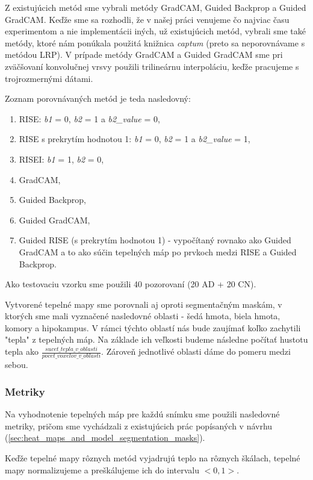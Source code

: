 Z existujúcich metód sme vybrali metódy GradCAM, Guided Backprop a Guided GradCAM. Keďže sme sa rozhodli, že v našej práci venujeme čo najviac času experimentom a nie implementácii iných, už existujúcich metód, vybrali sme také metódy, ktoré nám ponúkala použitá knižnica \textit{captum} (preto sa neporovnávame s metódou LRP). V prípade metódy GradCAM a Guided GradCAM sme pri zväčšovaní konvolučnej vrsvy použili trilineárnu interpoláciu, keďže pracujeme s trojrozmernými dátami.

Zoznam porovnávaných metód je teda nasledovný:

\begin{enumerate}[label=\Alph*]
    \item RISE: \textit{b1} = 0, \textit{b2} = 1 a \textit{b2\_value} = 0,
    \item RISE s prekrytím hodnotou 1: \textit{b1} = 0, \textit{b2} = 1 a \textit{b2\_value} = 1,
    \item RISEI: \textit{b1} = 1, \textit{b2} = 0,
    \item GradCAM,
    \item Guided Backprop,
    \item Guided GradCAM,
    \item Guided RISE (s prekrytím hodnotou 1) - vypočítaný rovnako ako Guided GradCAM a to ako súčin tepelných máp po prvkoch medzi RISE a Guided Backprop.
\end{enumerate}

Ako testovaciu vzorku sme použili 40 pozorovaní (20 AD + 20 CN).

Vytvorené tepelné mapy sme porovnali aj oproti segmentačným maskám, v ktorých sme mali vyznačené nasledovné oblasti - šedá hmota, biela hmota, komory a hipokampus. V rámci týchto oblastí nás bude zaujímať koľko zachytili "tepla" z tepelných máp. Na základe ich veľkosti budeme následne počítať hustotu tepla ako $\frac{sucet\_tepla\_v\_oblasti}{pocet\_voxelov\_v\_ oblasti}$. Zároveň jednotlivé oblasti dáme do pomeru medzi sebou. 

\subsubsection{Metriky \label{sec:verification_experiments_metrics}}

Na vyhodnotenie tepelných máp pre každú snímku sme použili nasledovné metriky, pričom sme vychádzali z existujúcich prác popísaných v návrhu (\ref{sec:heat_maps_and_model_segmentation_masks}). 

Keďže tepelné mapy rôznych metód vyjadrujú teplo na rôznych škálach, tepelné mapy normalizujeme a preškálujeme ich do intervalu $<0, 1>$.

